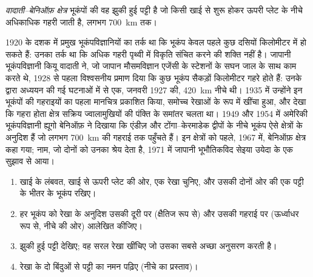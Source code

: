 \begin{definition}[वादाती--बेनिऑफ़ क्षेत्र]\label{def:g11:subduction-zones:benioff}
\emph{वादाती--बेनिऑफ़ क्षेत्र} भूकंपों की वह झुकी हुई
पट्टी है जो किसी खाई से शुरू होकर ऊपरी प्लेट के नीचे अधिकाधिक
गहरी जाती है, लगभग \qty{700}{km} तक।
\end{definition}

\begin{history}[वादाती और बेनिऑफ़]
1920 के दशक में प्रमुख भूकंपविज्ञानियों का तर्क था कि भूकंप केवल
पहले कुछ दसियों किलोमीटर में हो सकते हैं: उनका तर्क था कि अधिक गहरी पृथ्वी में
विकृति संचित करने की शक्ति नहीं है। जापानी भूकंपविज्ञानी कियू वादाती ने, जो
जापान मौसमविज्ञान एजेंसी के स्टेशनों के सघन जाल के साथ काम करते थे, 1928 से
पहला विश्वसनीय प्रमाण दिया कि कुछ भूकंप सैकड़ों
किलोमीटर गहरे होते हैं: उनके द्वारा अध्ययन की गई घटनाओं में से एक, जनवरी 1927 की,
\qty{420}{km} नीचे थी। 1935 में उन्होंने इन भूकंपों की गहराइयों का पहला
मानचित्र प्रकाशित किया, समोच्च रेखाओं के रूप में खींचा हुआ, और देखा कि गहरा होता
क्षेत्र सक्रिय ज्वालामुखियों की पंक्ति के समांतर चलता था। 1949 और 1954 में
अमेरिकी भूकंपविज्ञानी ह्यूगो बेनिऑफ़ ने दिखाया कि एंडीज़ और
टोंगा--केरमाडेक द्वीपों के नीचे भूकंप ऐसे क्षेत्रों के अनुदिश हैं जो लगभग
\qty{700}{km} की गहराई तक पहुँचते हैं। इन क्षेत्रों को पहले, 1967 में, बेनिऑफ़ क्षेत्र कहा गया;
 नाम, जो दोनों को उनका श्रेय देता है, 1971 में
जापानी भूभौतिकविद सेइया उयेदा के एक सुझाव से आया।
\end{history}

\begin{method}[भूकंप-काट को पढ़ना]\label{met:g11:subduction-zones:section}
\begin{enumerate}
  \item खाई के लंबवत, खाई से ऊपरी प्लेट की ओर, एक रेखा
        चुनिए, और उसकी दोनों ओर की एक पट्टी के भीतर के भूकंप
        रखिए।
  \item हर भूकंप को रेखा के अनुदिश उसकी दूरी पर (क्षैतिज रूप से)
        और उसकी गहराई पर (ऊर्ध्वाधर रूप से, नीचे की ओर) आलेखित कीजिए।
  \item झुकी हुई पट्टी देखिए; वह सरल रेखा खींचिए जो उसका सबसे अच्छा
        अनुसरण करती है।
  \item रेखा के दो बिंदुओं से पट्टी का नमन पढ़िए (नीचे का
        प्रस्ताव)।
\end{enumerate}
\end{method}

